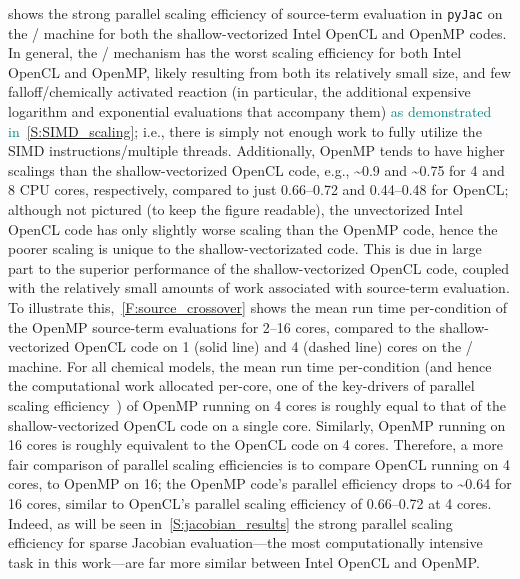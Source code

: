 \documentclass[12pt,number,sort&compress,preprint]{elsarticle}
\newcommand{\add}[1]{{\sloppy\textcolor{teal}{#1}}}  %
\begin{document}
 shows the strong parallel scaling efficiency of source-term evaluation in \texttt{pyJac} on the \avx/ machine for both the shallow-vectorized Intel OpenCL and OpenMP codes.
In general, the \slash{} mechanism has the worst scaling efficiency for both Intel OpenCL and OpenMP, likely resulting from both its relatively small size, and few falloff\slash chemically activated reaction (in particular, the additional expensive logarithm and exponential evaluations that accompany them) \add{as demonstrated in~\cref{S:SIMD_scaling}}; i.e., there is simply not enough work to fully utilize the SIMD instructions\slash multiple threads.
Additionally, OpenMP tends to have higher scalings than the shallow-vectorized OpenCL code, e.g., \textasciitilde\num{0.9} and \textasciitilde\num{0.75} for \num{4} and \num{8} CPU cores, respectively, compared to just \numrange{0.66}{0.72} and \numrange{0.44}{0.48} for OpenCL; although not pictured (to keep the figure readable), the unvectorized Intel OpenCL code has only slightly worse scaling than the OpenMP code, hence the poorer scaling is unique to the shallow-vectorizated code.
This is due in large part to the superior performance of the shallow-vectorized OpenCL code, coupled with the relatively small amounts of work associated with source-term evaluation.
To illustrate this,~\cref{F:source_crossover} shows the mean run time per-condition of the OpenMP source-term evaluations for \numrange{2}{16} cores, compared to the shallow-vectorized OpenCL code on \num{1} (solid line) and \num{4} (dashed line) cores on the \avx/ machine.
For all chemical models, the mean run time per-condition (and hence the computational work allocated per-core, one of the key-drivers of parallel scaling efficiency~\cite{strong_scaling}) of OpenMP running on \num{4} cores is roughly equal to that of the shallow-vectorized OpenCL code on a single core.
Similarly, OpenMP running on \num{16} cores is roughly equivalent to the OpenCL code on \num{4} cores.
Therefore, a more fair comparison of parallel scaling efficiencies is to compare OpenCL running on \num{4} cores, to OpenMP on \num{16}; the OpenMP code's parallel efficiency drops to \textasciitilde\num{0.64} for \num{16} cores, similar to OpenCL's parallel scaling efficiency of \numrange{0.66}{0.72} at \num{4} cores.
Indeed, as will be seen in~\cref{S:jacobian_results} the strong parallel scaling efficiency for sparse Jacobian evaluation---the most computationally intensive task in this work---are far more similar between Intel OpenCL and OpenMP.
\end{document}
